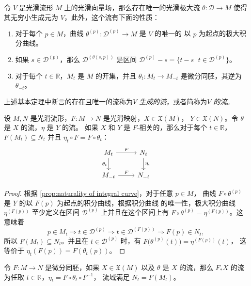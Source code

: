 \begin{theorem}[流的基本定理]
  令 $V$ 是光滑流形 $M$ 上的光滑向量场，那么存在唯一的光滑极大流 $\theta:\mathcal{D}\to M$
  使得其无穷小生成元为 $V$，此外，这个流有下面的性质：
  \begin{enumerate}
    \item 对于每个 $p\in M$，曲线 $\theta^{(p)}:\mathcal{D}^{(p)}\to M$ 是 $V$ 的唯一的
    以 $p$ 为起点的极大积分曲线。
    \item 如果 $s\in \mathcal{D}^{(p)}$，那么 $\mathcal{D}^{(\theta(s,p))}$ 是区间
    $\mathcal{D}^{(p)}-s=\{t-s\,|\, t\in \mathcal{D}^{(p)}\}$。
    \item 对于每个 $t\in \mathbb{R}$，$M_t$ 是 $M$ 的开集，并且 $\theta_t:M_t\to M_{-t}$
    是微分同胚，其逆为 $\theta_{-t}$。
  \end{enumerate}
\end{theorem}

上述基本定理中断言的存在且唯一的流称为\emph{$V$ 生成的流}，或者简称为\emph{$V$ 的流}。

\begin{proposition}[流的自然性]
  设 $M,N$ 是光滑流形，$F:M\to N$ 是光滑映射，$X\in \mathfrak{X}(M)$，
  $Y\in \mathfrak{X}(N)$。令 $\theta$ 是 $X$ 的流，$\eta$ 是 $Y$ 的流。
  如果 $X$ 和 $Y$ 是 $F$-相关的，那么对于每个 $t\in \mathbb{R}$，
  $F(M_t)\subseteq N_t$ 并且 $\eta_t\circ F=F\circ\theta_t$：
  \[
    \begin{tikzcd}
      M_t\arrow[r,"F"]\arrow[d,"\theta_t"'] & N_t\arrow[d,"\eta_t"]\\
      M_{-t}\arrow[r,"F"] & N_{-t}
    \end{tikzcd}  
  \]
\end{proposition} 
\begin{proof}
  根据 \autoref{prop:naturality of integral curve}，对于任意 $p\in M$，
  曲线 $F\circ\theta^{(p)}$ 是 $Y$ 的以 $F(p)$ 为起点的积分曲线，根据积分曲线
  的唯一性，极大积分曲线 $\eta^{(F(p))}$ 至少定义在区间 $\mathcal{D}^{(p)}$
  上并且在这个区间上有 $F\circ\theta^{(p)}=\eta^{(F(p))}$。这意味着
  \[
    p\in M_t\Rightarrow t\in \mathcal{D}^{(p)}  
    \Rightarrow t\in \mathcal{D}^{(F(p))}\Rightarrow F(p)\in N_t,
  \]
  所以 $F(M_t)\subseteq N_t$。并且在 $t\in \mathcal{D}^{(p)}$
  时，有 $F\bigl(\theta^{(p)}(t)\bigr)=\eta^{(F(p))}(t)$，
  这等价于 $\eta_t(F(p))=F(\theta_t(p))$。
\end{proof}

\begin{corollary}[流的微分同胚不变性]
  令 $F:M\to N$ 是微分同胚，如果 $X\in \mathfrak{X}(M)$ 以及
  $\theta$ 是 $X$ 的流，那么 $F_*X$ 的流为任取 $t\in \mathbb{R}$，$\eta_t=F\circ\theta_t\circ F^{-1}$，
  流域满足 $N_t=F(M_t)$。
\end{corollary}

